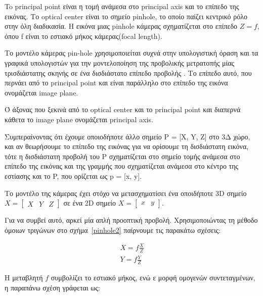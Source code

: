 To principal point είναι η τομή ανάμεσα στο principal axis και το επίπεδο της εικόνας. Το optical center είναι το σημείο pinhole, το οποίο παίζει κεντρικό ρόλο στην όλη διαδικασία. Η εικόνα μιας pinhole κάμερας σχηματίζεται στο επίπεδο $Z=f$, όπου f είναι το εστιακό μήκος κάμερας(focal length).

Το μοντέλο κάμερας pin-hole χρησιμοποιείται συχνά στην υπολογιστική όραση και τα γραφικά υπολογιστών για την μοντελοποίηση της προβολικής μετρατοπής μίας τρισδιάστατης σκηνής σε ένα δισδιάστατο επίπεδο προβολής \cite{hartley2003multiple} .
Το επίπεδο αυτό, που περνάει από το principal point και είναι παράλληλο στο επίπεδο της εικόνα ονομάζεται image plane.

Ό άξονας που ξεκινά από το optical center και το principal point και διαπερνά κάθετα το image plane ονομάζεται principal axis.








Συμπεραίνοντας ότι έχουμε οποιοδήποτε άλλο σημείο P = [X, Y, Z] στο 3Δ χώρο, και αν θεωρήσουμε το επίπεδο της εικόνας για να ορίσουμε τη δισδιάστατη εικόνα, τότε η δισδιάστατη προβολή του P σχηματίζεται στο σημείο τομής ανάμεσα στο επίπεδο της εικόνας και της γραμμής που σχηματίζεται ανάμεσα στο κέντρο της εστίασης και το P, που ορίζεται ως p = [x, y]. 



Το μοντέλο της κάμερας έχει στόχο να μετασχηματίσει ένα οποιδήποτε 3D σημείο $X = \begin{bmatrix} X & Y & Z \end{bmatrix}$ σε ένα 2D σημείο $X = \begin{bmatrix} x & y\end{bmatrix}$. 




Για να συμβεί αυτό, αρκεί μία απλή προοπτική προβολή. Χρησιμοποιώντας τη μέθοδο όμοιων τριγώνων στο σχήμα~\ref{pinhole2} παίρνουμε τις παρακάτω σχέσεις:


\begin{equation}
\begin{aligned}
X=f\frac{X}{Z}\\
Y=f\frac{Y}{Z}
\end{aligned}
\end{equation}


Η μεταβλητή $f$ συμβολίζει το εστιακό μήκος, ενώ ε μορφή ομογενών συντεταγμένων, η παραπάνω σχέση γράφεται ως:

